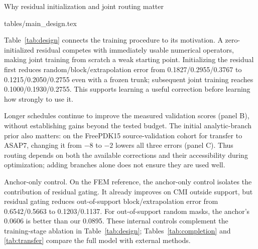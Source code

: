\documentclass{article}
\makeatletter
\renewcommand{\section}{\@startsection{section}{1}{\z@}
  {-8pt plus -2pt minus -1pt}{4pt}{\large\sc\raggedright}}
\renewcommand{\paragraph}{\@startsection{paragraph}{4}{\z@}
  {4pt plus 1pt minus 1pt}{-1em}{\normalsize\bf}}
\newcommand{\tabdir}{tables}
\newcommand{\tableinput}[1]{\@@input \tabdir/#1 }
\makeatother
\begin{document}
\section{Why residual initialization and joint routing matter}
\label{sec:ablations}
\label{app:ablations}

\begin{table}[htbp]
\centering
\caption{\textbf{Design choices behind neural--numerical routing.} Validation NRMSE
($\downarrow$). Each panel is a separate controlled comparison, retaining its
recorded validation protocol macro rather than the regime-specific
confirmation scores of Tables~\ref{tab:completion}--\ref{tab:transfer}.
Panel A controls architecture, data and budget; B varies stage-2 updates;
C varies the initial prior of the eight analytic corrections.}
\label{tab:design}\label{tab:ablations}\label{tab:schedule}\label{tab:gap}
\tableinput{main_design.tex}
\end{table}

Table~\ref{tab:design} connects the training procedure to its motivation.
A zero-initialized residual competes with immediately usable numerical
operators, making joint training from scratch a weak starting point.
Initializing the residual first reduces random/block/extrapolation error
from 0.1827/0.2955/0.3767 to 0.1215/0.2050/0.2755 even with a frozen trunk;
subsequent joint training reaches 0.1000/0.1930/0.2755. This supports learning
a useful correction before learning how strongly to use it.

Longer schedules continue to improve the measured validation scores
(panel B), without establishing gains beyond the tested budget.
The initial analytic-branch prior also matters: on the FreePDK15 source-validation
cohort for transfer to ASAP7, changing it from $-8$ to $-2$ lowers all three errors (panel C).
Thus routing depends on both the available corrections and their accessibility
during optimization; adding branches alone does not ensure they are used well.

\paragraph{Anchor-only control.}
On the FEM reference, the anchor-only control isolates the contribution of
residual gating. It already improves on CMI outside support, but residual
gating reduces out-of-support block/extrapolation error from 0.6542/0.5663 to
0.1203/0.1137. For out-of-support random masks, the anchor's 0.0606 is better
than our 0.0895. These internal controls complement the training-stage
ablation in Table~\ref{tab:design}; Tables~\ref{tab:completion} and
\ref{tab:transfer} compare the full model with external methods.
\end{document}
